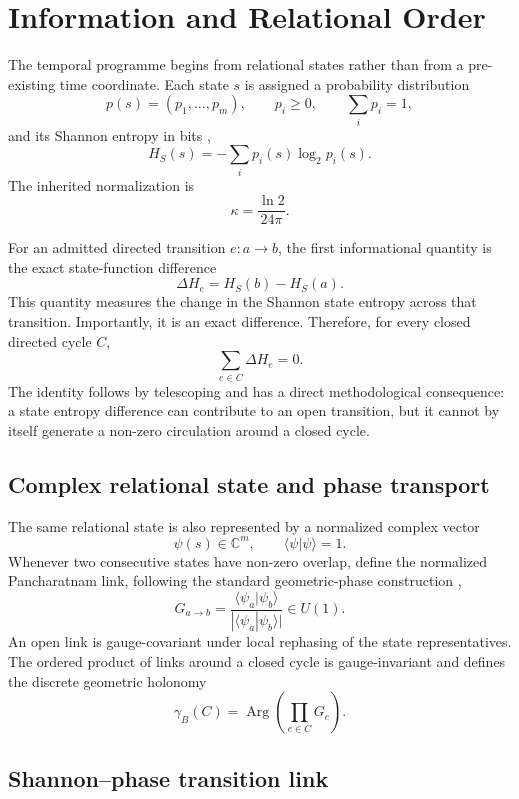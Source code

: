 \chapter{Information and Relational Order}

The temporal programme begins from relational states rather than from a pre-existing time coordinate. Each state $s$ is assigned a probability distribution
\[
p(s)=(p_1,\ldots,p_m),
\qquad
p_i\geq0,
\qquad
\sum_i p_i=1,
\]
and its Shannon entropy in bits \cite{Shannon1948},
\[
\boxed{
H_S(s)=-\sum_i p_i(s)\log_2p_i(s).
}
\]
The inherited normalization is
\[
\kappa=\frac{\ln2}{24\pi}.
\]

For an admitted directed transition $e:a\to b$, the first informational quantity is the exact state-function difference
\[
\Delta H_e=H_S(b)-H_S(a).
\]
This quantity measures the change in the Shannon state entropy across that transition. Importantly, it is an exact difference. Therefore, for every closed directed cycle $C$,
\[
\boxed{
\sum_{e\in C}\Delta H_e=0.
}
\]
The identity follows by telescoping and has a direct methodological consequence: a state entropy difference can contribute to an open transition, but it cannot by itself generate a non-zero circulation around a closed cycle.

\section{Complex relational state and phase transport}

The same relational state is also represented by a normalized complex vector
\[
\psi(s)\in\mathbb C^m,
\qquad
\langle\psi|\psi\rangle=1.
\]
Whenever two consecutive states have non-zero overlap, define the normalized Pancharatnam link, following the standard geometric-phase construction \cite{Pancharatnam1956,Berry1984},
\[
G_{a\to b}
=
\frac{\langle\psi_a|\psi_b\rangle}
{|\langle\psi_a|\psi_b\rangle|}
\in U(1).
\]
An open link is gauge-covariant under local rephasing of the state representatives. The ordered product of links around a closed cycle is gauge-invariant and defines the discrete geometric holonomy
\[
\gamma_B(C)
=
\operatorname{Arg}\!\left(\prod_{e\in C}G_e\right).
\]

\section{Shannon--phase transition link}

